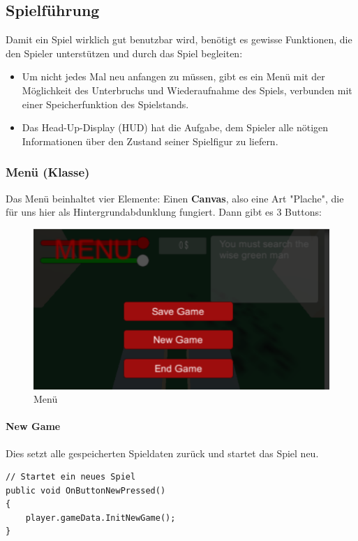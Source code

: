 \subsection{Spielführung}
Damit ein Spiel wirklich gut benutzbar wird, benötigt es gewisse Funktionen, die den Spieler unterstützen und durch das Spiel begleiten:
\begin{itemize}
\item Um nicht jedes Mal neu anfangen zu müssen, gibt es ein Menü mit der Möglichkeit des Unterbruchs und Wiederaufnahme des Spiels, verbunden mit einer Speicherfunktion des Spielstands.
\item Das Head-Up-Display (HUD) hat die Aufgabe, dem Spieler alle nötigen Informationen über den Zustand seiner Spielfigur zu liefern.
\end{itemize}

\subsubsection{Menü (Klasse)}
Das Menü beinhaltet vier Elemente: Einen \textbf{Canvas}, also eine Art "Plache", die für uns hier als Hintergrundabdunklung fungiert. Dann gibt es 3 Buttons:

\begin{figure}[H]
\includegraphics[scale=1]{screenshots/menuscreen.png}
\caption{Menü}
\end{figure}


\paragraph{New Game}
Dies setzt alle gespeicherten Spieldaten zurück und startet das Spiel neu.

\begin{lstlisting}[caption={New Game}]
// Startet ein neues Spiel
public void OnButtonNewPressed()
{
	player.gameData.InitNewGame();
}

\end{lstlisting}

